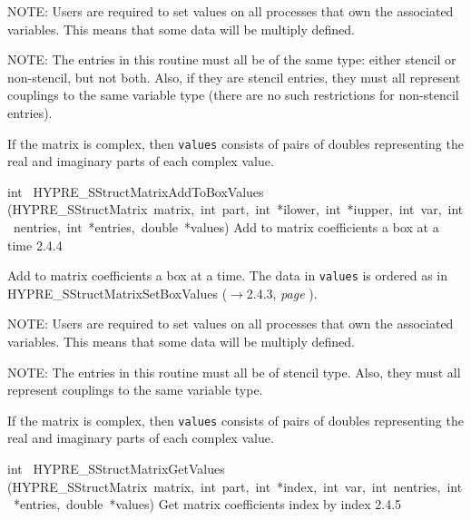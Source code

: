\documentclass{article}
\begin{document}
\begin{cxxentry}
\begin{cxxentry}
\begin{cxxfunction}
\begin{cxxdoc}
NOTE: Users are required to set values on all processes that own the
associated variables.  This means that some data will be multiply defined.

NOTE: The entries in this routine must all be of the same type: either
stencil or non-stencil, but not both.  Also, if they are stencil entries,
they must all represent couplings to the same variable type (there are no
such restrictions for non-stencil entries).

If the matrix is complex, then {\tt values} consists of pairs of doubles
representing the real and imaginary parts of each complex value.


\end{cxxdoc}
\end{cxxfunction}
\begin{cxxfunction}
{int\ }
        {HYPRE\_SStructMatrixAddToBoxValues}
        {(HYPRE\_SStructMatrix\ matrix,\ int\ part,\ int\ *ilower,\ int\ *iupper,\ int\ var,\ int\ nentries,\ int\ *entries,\ double\ *values)}
        {
Add to matrix coefficients a box at a time}
        {2.4.4}
\begin{cxxdoc}

Add to matrix coefficients a box at a time.  The data in {\tt values} is
ordered as in HYPRE\_SStructMatrixSetBoxValues ($\rightarrow$2.4.3, {\em page \pageref{cxx.2.4.3}}).

NOTE: Users are required to set values on all processes that own the
associated variables.  This means that some data will be multiply defined.

NOTE: The entries in this routine must all be of stencil type.  Also, they
must all represent couplings to the same variable type.

If the matrix is complex, then {\tt values} consists of pairs of doubles
representing the real and imaginary parts of each complex value.


\end{cxxdoc}
\end{cxxfunction}
\begin{cxxfunction}
{int\ }
        {HYPRE\_SStructMatrixGetValues}
        {(HYPRE\_SStructMatrix\ matrix,\ int\ part,\ int\ *index,\ int\ var,\ int\ nentries,\ int\ *entries,\ double\ *values)}
        {
Get matrix coefficients index by index}
        {2.4.5}
\begin{cxxdoc}


\end{cxxdoc}
\end{cxxfunction}
\end{cxxentry}
\end{cxxentry}
\end{document}
